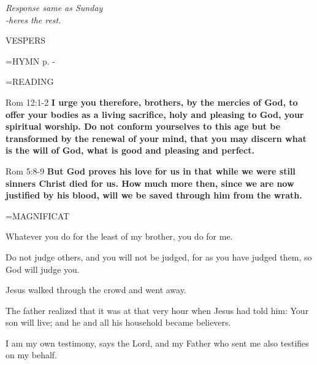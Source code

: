 \begin{center}
\textit{Response same as Sunday\\
-heres the rest.}
\end{center}

\begin{flushleft}\normalsize VESPERS\\\end{flushleft}

\hangindent=\parindent \small{\uppercase{HYMN} p.  \pageref{lent:firstHymn} - \pageref{lent:lastHymn}\\}

\hangindent=\parindent \small READING
\begin{description}[labelindent=\parindent, leftmargin=*]
\item [Weeks 1-4:]      Rom 12:1-2 \textbf{     I urge you therefore, brothers, by the mercies of God, to offer your bodies as a living sacrifice, holy and pleasing to God, your spiritual worship. Do not conform yourselves to this age but be transformed by the renewal of your mind, that you may discern what is the will of God, what is good and pleasing and perfect.}
\item [Week 5:]      Rom 5:8-9 \textbf{     But God proves his love for us in that while we were still sinners Christ died for us. How much more then, since we are now justified by his blood, will we be saved through him from the wrath.}
\end{description}

\hangindent=\parindent \small MAGNIFICAT
\begin{description}[labelindent=\parindent, noitemsep, leftmargin=*]
\item [Week 1:] 	Whatever you do for the least of my brother, you do for me.
\item [Week 2:] 	Do not judge others, and you will not be judged, for as you have judged them, so God will judge you.
\item [Week 3:] 	Jesus walked through the crowd and went away.
\item [Week 4:] 	The father realized that it was at that very hour when Jesus had told him: Your son will live; and he and all his household became believers.
\item [Week 5:] 	I am my own testimony, says the Lord, and my Father who sent me also testifies on my behalf.
\end{description}
